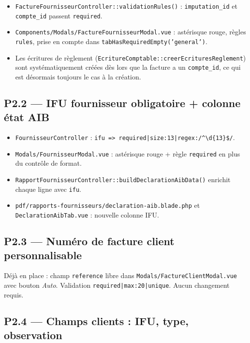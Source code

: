 \documentclass[11pt,a4paper]{article}
\newcommand{\modfile}[1]{\texttt{\small #1}}
\begin{document}
\begin{itemize}[leftmargin=1.4em]
  \item \modfile{FactureFournisseurController::validationRules()} :
    \texttt{imputation\_id} et \texttt{compte\_id} passent \texttt{required}.
  \item \modfile{Components/Modals/FactureFournisseurModal.vue} : astérisque rouge,
    règles \texttt{rules}, prise en compte dans \texttt{tabHasRequiredEmpty('general')}.
  \item Les écritures de règlement (\texttt{EcritureComptable::creerEcrituresReglement})
    sont systématiquement créées dès lors que la facture a un \texttt{compte\_id},
    ce qui est désormais toujours le cas à la création.
\end{itemize}

\subsection{P2.2 --- IFU fournisseur obligatoire + colonne état AIB}

\begin{itemize}[leftmargin=1.4em]
  \item \modfile{FournisseurController} : \texttt{ifu => required|size:13|regex:/\^{}\textbackslash d\{13\}\$/}.
  \item \modfile{Modals/FournisseurModal.vue} : astérisque rouge + règle
    \texttt{required} en plus du contrôle de format.
  \item \modfile{RapportFournisseurController::buildDeclarationAibData()} enrichit
    chaque ligne avec \texttt{ifu}.
  \item \modfile{pdf/rapports-fournisseurs/declaration-aib.blade.php} et
    \modfile{DeclarationAibTab.vue} : nouvelle colonne IFU.
\end{itemize}

\subsection{P2.3 --- Numéro de facture client personnalisable}

Déjà en place : champ \texttt{reference} libre dans
\modfile{Modals/FactureClientModal.vue} avec bouton \emph{Auto}. Validation
\texttt{required|max:20|unique}. Aucun changement requis.

\subsection{P2.4 --- Champs clients : IFU, type, observation}
\end{document}
